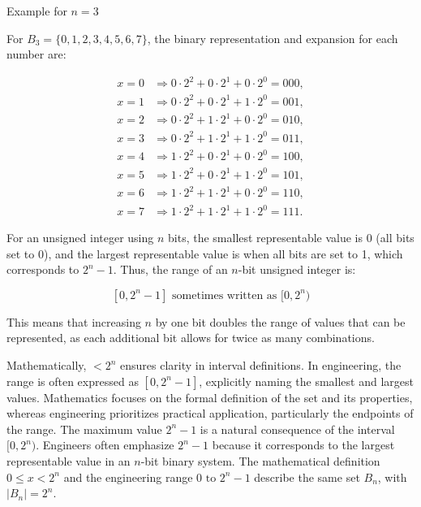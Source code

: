 Example for \( n = 3 \)

For \( B_3 = \{0, 1, 2, 3, 4, 5, 6, 7\} \), the binary representation and expansion for each number are:

\[
\begin{aligned}
x = 0 & \Rightarrow 0 \cdot 2^2 + 0 \cdot 2^1 + 0 \cdot 2^0 = 000, \\
x = 1 & \Rightarrow 0 \cdot 2^2 + 0 \cdot 2^1 + 1 \cdot 2^0 = 001, \\
x = 2 & \Rightarrow 0 \cdot 2^2 + 1 \cdot 2^1 + 0 \cdot 2^0 = 010, \\
x = 3 & \Rightarrow 0 \cdot 2^2 + 1 \cdot 2^1 + 1 \cdot 2^0 = 011, \\
x = 4 & \Rightarrow 1 \cdot 2^2 + 0 \cdot 2^1 + 0 \cdot 2^0 = 100, \\
x = 5 & \Rightarrow 1 \cdot 2^2 + 0 \cdot 2^1 + 1 \cdot 2^0 = 101, \\
x = 6 & \Rightarrow 1 \cdot 2^2 + 1 \cdot 2^1 + 0 \cdot 2^0 = 110, \\
x = 7 & \Rightarrow 1 \cdot 2^2 + 1 \cdot 2^1 + 1 \cdot 2^0 = 111.
\end{aligned}
\]


For an unsigned integer using \( n \) bits, the smallest representable value is 0 (all bits set to 0), and the largest representable value is when all bits are set to 1, which corresponds to \( 2^n - 1 \). Thus, the range of an \( n \)-bit unsigned integer is:

\[
[0, 2^n - 1] \text{ sometimes written as } [0, 2^n)
\]

This means that increasing \( n \) by one bit doubles the range of values that can be represented, as each additional bit allows for twice as many combinations.

Mathematically, \( < 2^n \) ensures clarity in interval definitions. In engineering, the range is often expressed as \( [0, 2^n - 1] \), explicitly naming the smallest and largest values. Mathematics focuses on the formal definition of the set and its properties, whereas engineering prioritizes practical application, particularly the endpoints of the range. The maximum value \( 2^n - 1 \) is a natural consequence of the interval \( [0, 2^n) \). Engineers often emphasize \( 2^n - 1 \) because it corresponds to the largest representable value in an \( n \)-bit binary system. The mathematical definition \( 0 \leq x < 2^n \) and the engineering range \( 0 \text{ to } 2^n - 1 \) describe the same set \( B_n \), with \( |B_n| = 2^n \).

